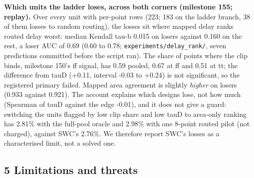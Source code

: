 \documentclass[conference]{IEEEtran}
\begin{document}
\textbf{Which units the ladder loses, across both corners (milestone
155; replay).} Over every unit with per-point rows (223; 183 on the
ladder branch, 38 of them losses to random routing), the losses sit
where mapped delay ranks routed delay worst: median Kendall tau-b 0.015
on losers against 0.160 on the rest, a loser AUC of 0.69 (0.60 to 0.78;
\texttt{experiments/\allowbreak{}delay\_\allowbreak{}rank/\allowbreak{}}, seven predictions committed before
the script ran). The share of points where the clip binds, milestone
150's ff signal, has 0.59 pooled, 0.67 at ff and 0.51 at tt; the
difference from tauD (+0.11, interval -0.03 to +0.24) is not
significant, so the registered primary failed. Mapped area agreement is
slightly \emph{higher} on losers (0.933 against 0.921). The account
explains which designs lose, not how much (Spearman of tauD against the
edge -0.01), and it does not give a guard: switching the units flagged
by low clip share and low tauD to area-only ranking has 2.81\% with the
full-pool oracle and 2.98\% with one 8-point routed pilot (not charged),
against SWC's 2.76\%. We therefore report SWC's losses as a
characterised limit, not a solved one.

\hypertarget{limitations-and-threats}{%
\subsection{5 Limitations and threats}\label{limitations-and-threats}}
\end{document}
